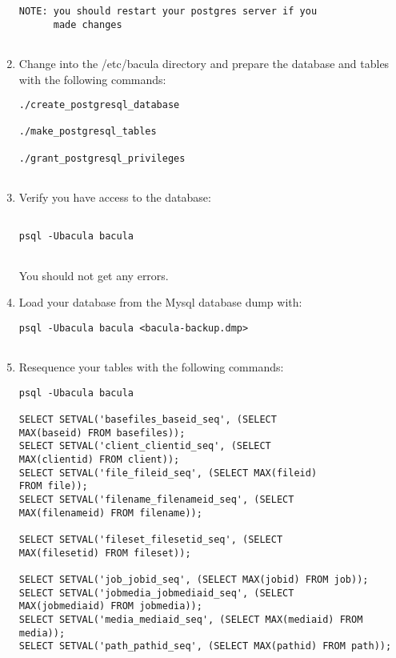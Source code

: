 \begin{enumerate}
\begin{verbatim}
NOTE: you should restart your postgres server if you
      made changes
      
\end{verbatim}
\normalsize

\item Change into the /etc/bacula directory and prepare the database  and
   tables with the following commands:  

\footnotesize
\begin{verbatim}
./create_postgresql_database
                                
./make_postgresql_tables
                                
./grant_postgresql_privileges
       
\end{verbatim}
\normalsize

\item Verify you have access to the database:  

   \footnotesize
\begin{verbatim}
  
psql -Ubacula bacula
      
\end{verbatim}
\normalsize

You should not get any errors.  
\item Load your database from the Mysql database dump with:  

   \footnotesize
\begin{verbatim}
psql -Ubacula bacula <bacula-backup.dmp>
      
\end{verbatim}
\normalsize

\item Resequence your tables with the following commands:  

   \footnotesize
\begin{verbatim}
psql -Ubacula bacula
                
SELECT SETVAL('basefiles_baseid_seq', (SELECT
MAX(baseid) FROM basefiles));
SELECT SETVAL('client_clientid_seq', (SELECT
MAX(clientid) FROM client));
SELECT SETVAL('file_fileid_seq', (SELECT MAX(fileid)
FROM file));
SELECT SETVAL('filename_filenameid_seq', (SELECT
MAX(filenameid) FROM filename));
                
SELECT SETVAL('fileset_filesetid_seq', (SELECT
MAX(filesetid) FROM fileset));
                
SELECT SETVAL('job_jobid_seq', (SELECT MAX(jobid) FROM job));
SELECT SETVAL('jobmedia_jobmediaid_seq', (SELECT
MAX(jobmediaid) FROM jobmedia));
SELECT SETVAL('media_mediaid_seq', (SELECT MAX(mediaid) FROM media));
SELECT SETVAL('path_pathid_seq', (SELECT MAX(pathid) FROM path));
                

\end{verbatim}
\end{enumerate}
